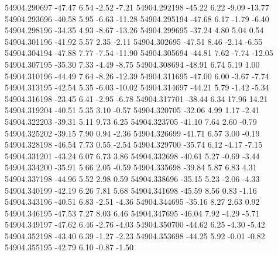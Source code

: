 54904.290697      -47.47        6.54       -2.52       -7.21
54904.292198      -45.22        6.22       -9.09      -13.77
54904.293696      -40.58        5.95       -6.63      -11.28
54904.295194      -47.68        6.17       -1.79       -6.40
54904.298196      -34.35        4.93       -8.67      -13.26
54904.299695      -37.24        4.80        5.04        0.54
54904.301196      -41.92        5.57        2.35       -2.11
54904.302695      -47.51        8.46       -2.14       -6.55
54904.304194      -47.88        7.77       -7.54      -11.90
54904.305694      -44.81        7.62       -7.74      -12.05
54904.307195      -35.30        7.33       -4.49       -8.75
54904.308694      -48.91        6.74        5.19        1.00
54904.310196      -44.49        7.64       -8.26      -12.39
54904.311695      -47.00        6.00       -3.67       -7.74
54904.313195      -42.54        5.35       -6.03      -10.02
54904.314697      -44.21        5.79       -1.42       -5.34
54904.316198      -23.45        6.41       -2.95       -6.78
54904.317701      -38.44        6.34       17.96       14.21
54904.319204      -40.51        5.35        3.10       -0.57
54904.320705      -32.06        4.99        1.17       -2.41
54904.322203      -39.31        5.11        9.73        6.25
54904.323705      -41.10        7.64        2.60       -0.79
54904.325202      -39.15        7.90        0.94       -2.36
54904.326699      -41.71        6.57        3.00       -0.19
54904.328198      -46.54        7.73        0.55       -2.54
54904.329700      -35.74        6.12       -4.17       -7.15
54904.331201      -43.24        6.07        6.73        3.86
54904.332698      -40.61        5.27       -0.69       -3.44
54904.334200      -35.91        5.66        2.05       -0.59
54904.335698      -39.84        5.87        6.83        4.31
54904.337198      -44.96        5.52        2.98        0.59
54904.338696      -35.15        5.23       -2.06       -4.33
54904.340199      -42.19        6.26        7.81        5.68
54904.341698      -45.59        8.56        0.83       -1.16
54904.343196      -40.51        6.83       -2.51       -4.36
54904.344695      -35.16        8.27        2.63        0.92
54904.346195      -47.53        7.27        8.03        6.46
54904.347695      -46.04        7.92       -4.29       -5.71
54904.349197      -47.62        6.46       -2.76       -4.03
54904.350700      -44.62        6.25       -4.30       -5.42
54904.352198      -43.40        6.39       -1.27       -2.23
54904.353698      -44.25        5.92       -0.01       -0.82
54904.355195      -42.79        6.10       -0.87       -1.50

